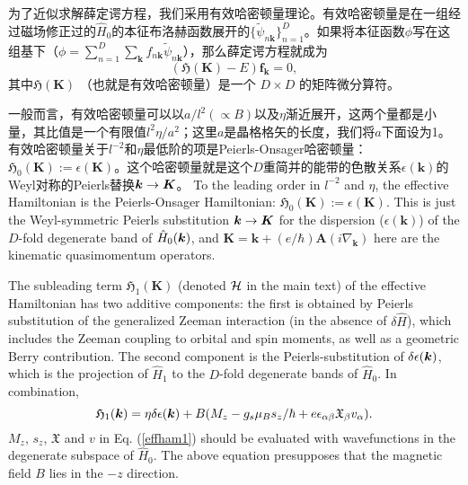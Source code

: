 \begin{appendices}
为了近似求解薛定谔方程，我们采用有效哈密顿量理论\cite{rotheffham,100p}。有效哈密顿量是在一组经过磁场修正过的$\hat{H}_0$的本征布洛赫函数展开的\cite{rotheffham}$\{\tilde{\psi}_{n\boldsymbol{k}}\}_{n=1}^D$。如果将本征函数$\phi$写在这组基下（$\phi=\sum_{n=1}^D\sum_{\boldsymbol{k}}f_{n\boldsymbol{k}}\tilde{\psi}_{n\boldsymbol{k}}$），那么薛定谔方程就成为
\begin{equation}
(\mathfrak{H}(\boldsymbol{K})-E)\boldsymbol{f}_{\boldsymbol{k}}=0,\label{eq:schrodinger}
\end{equation}
其中$\mathfrak{H}(\boldsymbol{K})$ （也就是有效哈密顿量）是一个 $D\times D$ 的矩阵微分算符。 

一般而言，有效哈密顿量可以以$a/l^2 (\propto B)$以及$\eta$渐近展开，这两个量都是小量，其比值是一个有限值$l^2\eta/a^2$；这里$a$是晶格格矢的长度，我们将$a$下面设为1。有效哈密顿量关于$l^{-2}$和$\eta$最低阶的项是Peierls-Onsager哈密顿量：$\mathfrak{H}_{0}(\boldsymbol{K}):=\epsilon(\boldsymbol{K})$。这个哈密顿量就是这个$D$重简并的能带的色散关系$\epsilon(\boldsymbol{k})$的Weyl对称的Peierls替换$\boldsymbol{k} \rightarrow \boldsymbol{K}$。
To the leading order in $l^{-2}$ and $\eta$, the effective Hamiltonian  is the Peierls-Onsager Hamiltonian: $\mathfrak{H}_{0}(\boldsymbol{K}):=\epsilon(\boldsymbol{K})$. This is just the Weyl-symmetric Peierls substitution $\boldsymbol{k} \rightarrow \boldsymbol{K}$ for the dispersion ($\epsilon(\boldsymbol{k})$) of the $D$-fold degenerate band of $\hat{H}_0(\boldsymbol{k})$, and $\boldsymbol{K}=\boldsymbol{k}+(e/\hbar)\boldsymbol{A}(i\nabla_{\boldsymbol{k}})$ here are the kinematic quasimomentum operators.

The subleading term $\mathfrak{H}_{1}(\boldsymbol{K})$ (denoted $\mathcal{H}$ in the main text) of the effective Hamiltonian has two additive components: the first is obtained by Peierls substitution of the generalized Zeeman interaction (in the absence of $\delta \hat{H}$), which includes the Zeeman coupling to orbital and spin moments, as well as a geometric Berry contribution. The second component is the Peierls-substitution of   $\delta \epsilon(\boldsymbol{k})$, which is the projection of $\hat{H}_1$ to the $D$-fold degenerate bands of $\hat{H}_0$. In combination,
\begin{equation}
\mathfrak{H}_1(\boldsymbol{k}) = \eta\delta \epsilon(\boldsymbol{k})+B(M_{z}-g_s\mu_{B}s_{z}/\hbar+e\epsilon_{\alpha\beta}\mathfrak{X}_{\beta}v_{\alpha}). \label{effham1}
\end{equation}
$M_z$, $s_z$, $\mathfrak{X}$ and $v$ in Eq. (\ref{effham1}) should be evaluated with wavefunctions in the degenerate subspace of $\hat{H}_0$. The above equation presupposes that the  magnetic field $B$ lies in the $-z$ direction.


\end{appendices}
